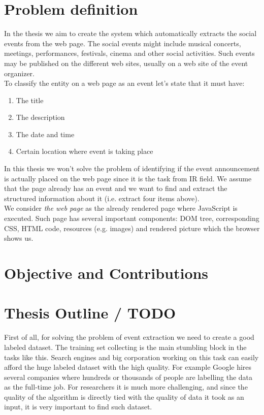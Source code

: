 \section{Problem definition}
In the thesis we aim to create the system which automatically extracts the social events from the web page. The social events might include musical concerts, meetings, performances, festivals, cinema and other social activities. Such events may be published on the different web sites, usually on a web site of the event organizer.\\

To classify the entity on a web page as an event let's state that it must have:
\begin{enumerate}
    \item The title
    \item The description
    \item The date and time
    \item Certain location where event is taking place
\end{enumerate}

In this thesis we won't solve the problem of identifying if the event announcement is actually placed on the web page since it is the task from IR field. We assume that the page already has an event and we want to find and extract the structured information about it (i.e. extract four items above).\\

We consider \textit{the web page} as the already rendered page where JavaScript is executed. Such page has several important components: DOM tree, corresponding CSS, HTML code, resources (e.g. images) and rendered picture which the browser shows us.\\  

\section{Objective and Contributions}

\section{Thesis Outline / TODO}

%
%
% 
First of all, for solving the problem of event extraction we need to create a good labeled dataset. The training set collecting is the main stumbling block in the tasks like this. Search engines and big corporation working on this task can easily afford the huge labeled dataset with the high quality. For example Google hires several companies where hundreds or thousands of people are labelling the data as the full-time job. For researchers it is much more challenging, and since the quality of the algorithm is directly tied with the quality of data it took as an input, it is very important to find such dataset. 


